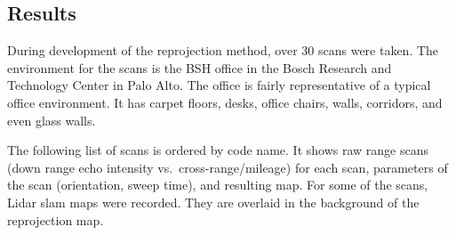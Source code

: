\subsection{Results}\label{results}

During development of the reprojection method, over 30 scans were taken.
The environment for the scans is the BSH office in the Bosch Research
and Technology Center in Palo Alto. The office is fairly representative
of a typical office environment. It has carpet floors, desks, office
chairs, walls, corridors, and even glass walls.

The following list of scans is ordered by code name. It shows raw range
scans (down range echo intensity vs.~cross-range/mileage) for each scan,
parameters of the scan (orientation, sweep time), and resulting map. For
some of the scans, Lidar slam maps were recorded. They are overlaid in
the background of the reprojection map.


